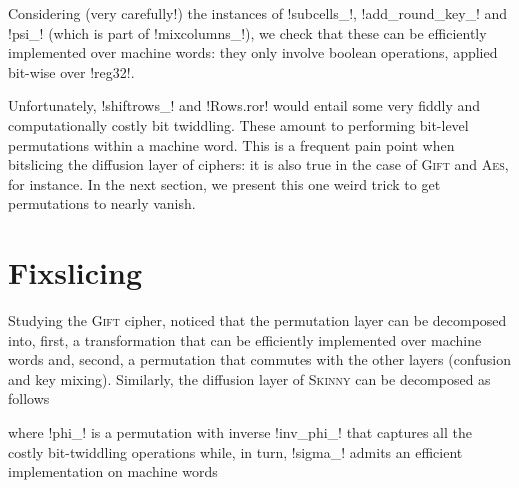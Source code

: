 \documentclass[draft,english]{jflart}
\newcommand{\Skinny}{\textsc{Skinny}}
\newcommand{\Gift}{\textsc{Gift}}
\newcommand{\AES}{\textsc{Aes}}
\begin{document}

Considering (very carefully!) the instances of \coqe!subcells_!,
\coqe!add_round_key_! and \coqe!psi_! (which is part of
\coqe!mixcolumns_!), we check that these can be efficiently
implemented over machine words: they only involve boolean operations,
applied bit-wise over \coqe!reg32!.

Unfortunately, \coqe!shiftrows_! and \coqe!Rows.ror! would entail some
very fiddly and computationally costly bit twiddling. These amount to
performing bit-level permutations within a machine word. This is a
frequent pain point when bitslicing the diffusion layer of ciphers: it
is also true in the case of \Gift{} and \AES{}, for instance. In the
next section, we present this one weird trick to get permutations to
nearly vanish.

\section{Fixslicing}
\label{sec:fixslicing}




Studying the \Gift{} cipher, \citet{adominicai:fixslicing-gift} noticed that the
permutation layer can be decomposed into, first, a transformation that
can be efficiently implemented over machine words and, second, a
permutation that commutes with the other layers (confusion and key
mixing). Similarly, the diffusion layer of \Skinny{} can be decomposed as
follows
%
\begin{prop}
\end{prop}
%
%
where \coqe!phi_! is a permutation with inverse \coqe!inv_phi_! that
captures all the costly bit-twiddling operations
%
%
%
while, in turn, \coqe!sigma_! admits an efficient implementation on
machine words
%
\end{document}
